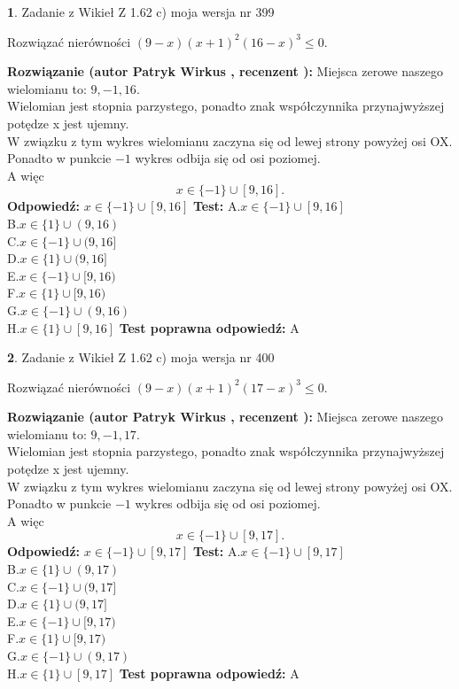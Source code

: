 \documentclass[12pt, a4paper]{article}
\theoremstyle{definition} %
\newtheorem{zad}{}
\newcommand{\zadStart}[1]{\begin{zad}#1\newline}
\newcommand{\zadStop}{\end{zad}}
\newcommand{\rozwStart}[2]{\noindent \textbf{Rozwiązanie (autor #1 , recenzent #2): }\newline}
\newcommand{\rozwStop}{\newline}
\newcommand{\odpStart}{\noindent \textbf{Odpowiedź:}\newline}
\newcommand{\odpStop}{\newline}
\newcommand{\testStart}{\noindent \textbf{Test:}\newline}
\newcommand{\testStop}{\newline}
\newcommand{\kluczStart}{\noindent \textbf{Test poprawna odpowiedź:}\newline}
\newcommand{\kluczStop}{\newline}
\begin{document}
\zadStart{Zadanie z Wikieł Z 1.62 c) moja wersja nr 399}

Rozwiązać nierówności $(9-x)(x+1)^{2}(16-x)^{3}\le0$.
\zadStop
\rozwStart{Patryk Wirkus}{}
Miejsca zerowe naszego wielomianu to: $9, -1, 16$.\\
Wielomian jest stopnia parzystego, ponadto znak współczynnika przy\linebreak najwyższej potędze x jest ujemny.\\ W związku z tym wykres wielomianu zaczyna się od lewej strony powyżej osi OX.\\
Ponadto w punkcie $-1$ wykres odbija się od osi poziomej.\\
A więc $$x \in \{-1\} \cup [9,16].$$
\rozwStop
\odpStart
$x \in \{-1\} \cup [9,16]$
\odpStop
\testStart
A.$x \in \{-1\} \cup [9,16]$\\
B.$x \in \{1\} \cup (9,16)$\\
C.$x \in \{-1\} \cup (9,16]$\\
D.$x \in \{1\} \cup (9,16]$\\
E.$x \in \{-1\} \cup [9,16)$\\
F.$x \in \{1\} \cup [9,16)$\\
G.$x \in \{-1\} \cup (9,16)$\\
H.$x \in \{1\} \cup [9,16]$
\testStop
\kluczStart
A
\kluczStop



\zadStart{Zadanie z Wikieł Z 1.62 c) moja wersja nr 400}

Rozwiązać nierówności $(9-x)(x+1)^{2}(17-x)^{3}\le0$.
\zadStop
\rozwStart{Patryk Wirkus}{}
Miejsca zerowe naszego wielomianu to: $9, -1, 17$.\\
Wielomian jest stopnia parzystego, ponadto znak współczynnika przy\linebreak najwyższej potędze x jest ujemny.\\ W związku z tym wykres wielomianu zaczyna się od lewej strony powyżej osi OX.\\
Ponadto w punkcie $-1$ wykres odbija się od osi poziomej.\\
A więc $$x \in \{-1\} \cup [9,17].$$
\rozwStop
\odpStart
$x \in \{-1\} \cup [9,17]$
\odpStop
\testStart
A.$x \in \{-1\} \cup [9,17]$\\
B.$x \in \{1\} \cup (9,17)$\\
C.$x \in \{-1\} \cup (9,17]$\\
D.$x \in \{1\} \cup (9,17]$\\
E.$x \in \{-1\} \cup [9,17)$\\
F.$x \in \{1\} \cup [9,17)$\\
G.$x \in \{-1\} \cup (9,17)$\\
H.$x \in \{1\} \cup [9,17]$
\testStop
\kluczStart
A
\kluczStop
\end{document}
